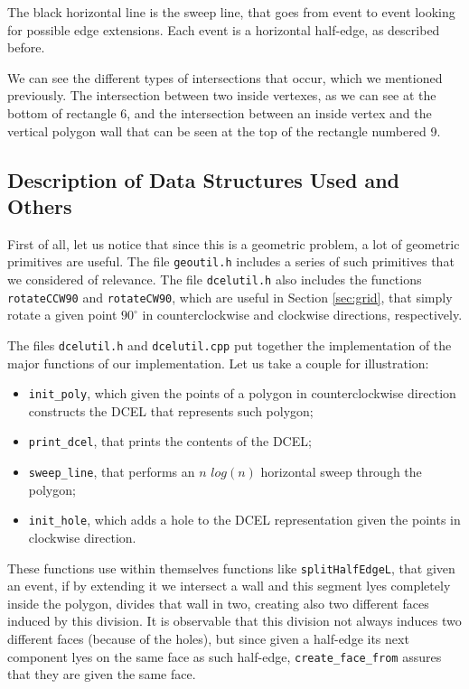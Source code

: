 \documentclass[12pt,a4paper,oneside]{article}
\begin{document}
The black horizontal line is the sweep line, that goes from event to event looking for possible edge extensions. Each event is a horizontal half-edge, as described before.

We can see the different types of intersections that occur, which we mentioned previously. The intersection between two inside vertexes, as we can see at the bottom of rectangle 6, and the intersection between an inside vertex and the vertical polygon wall that can be seen at the top of the rectangle numbered 9.

\subsection{Description of Data Structures Used and Others}\label{subsec:data}

First of all, let us notice that since this is a geometric problem, a lot of geometric primitives are useful. The file \texttt{geoutil.h} includes a series of such primitives that we considered of relevance. The file \texttt{dcelutil.h} also includes the functions \texttt{rotateCCW90} and \texttt{rotateCW90}, which are useful in Section \ref{sec:grid}, that simply rotate a given point $90^{\circ}$ in counterclockwise and clockwise directions, respectively.

The files \texttt{dcelutil.h} and \texttt{dcelutil.cpp} put together the implementation of the major functions of our implementation. Let us take a couple for illustration:

\begin{itemize}
	\item \texttt{init\_poly}, which given the points of a polygon in counterclockwise direction constructs the DCEL that represents such polygon;
	\item \texttt{print\_dcel}, that prints the contents of the DCEL;
	\item \texttt{sweep\_line}, that performs an $n$ $log\left( n \right)$ horizontal sweep through the polygon;
	\item \texttt{init\_hole}, which adds a hole to the DCEL representation given the points in clockwise direction.
\end{itemize}

These functions use within themselves functions like \texttt{splitHalfEdgeL}, that given an event, if by extending it we intersect a wall and this segment lyes completely inside the polygon, divides that wall in two, creating also two different faces induced by this division. It is observable that this division not always induces two different faces (because of the holes), but since given a half-edge its next component lyes on the same face as such half-edge, \texttt{create\_face\_from} assures that they are given the same face.
\end{document}
